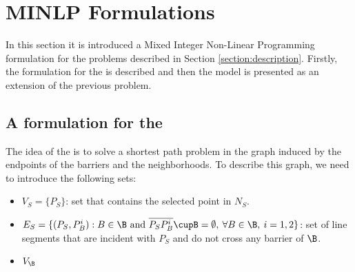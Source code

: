\section{MINLP Formulations}

In this section it is introduced a Mixed Integer Non-Linear Programming formulation for the problems described in Section \ref{section:description}. Firstly, the formulation for the \SPP is described and then the model \TSP is presented as an extension of the previous problem.

\subsection{A formulation for the \SPP}
The idea of the \SPP is to solve a shortest path problem in the graph induced by the endpoints of the barriers and the neighborhoods. To describe this graph, we need to introduce the following sets:

\begin{itemize}
\item $V_S=\{P_S\}$: set that contains the selected point in $N_S$.
\item $E_S=\{(P_S,P^i_B):B\in\B\text{ and }\overline{P_SP^i_B}\cupB=\emptyset,\:\forall B\in\B,\:i=1,2\}$: set of line segments that are incident with $P_S$ and do not cross any barrier of $\B$.
\item $V_\B$
\end{itemize}
